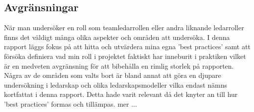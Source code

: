 \subsection{Avgränsningar}
När man undersöker en roll som teamledarrollen eller andra liknande ledarroller finns det väldigt många olika aspekter och områden att undersöka. I denna rapport läggs fokus på att hitta och utvärdera mina egna 'best practices' samt att försöka definiera vad min roll i projektet faktiskt har inneburit i praktiken vilket är en medveten avgränsning för att bibehålla en rimlig storlek på rapporten.
\newline \newline
Några av de områden som valts bort är bland annat att göra en djupare undersökning i ledarskap och olika ledarskapsmodeller vilka endast nämns kortfattat i denna rapport. Detta hade varit relevant då det knyter an till hur 'best practices' formas och tillämpas. mer ...
